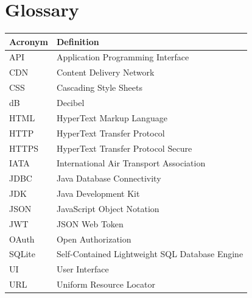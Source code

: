 \documentclass[12pt]{article}
\begin{document}
\newpage

\section{Glossary}

\begin{tabular}{|l|l|}
\hline
Acronym & Definition \\
\hline
API & Application Programming Interface \\
CDN & Content Delivery Network \\
CSS & Cascading Style Sheets \\
dB & Decibel \\
HTML & HyperText Markup Language \\
HTTP & HyperText Transfer Protocol \\
HTTPS & HyperText Transfer Protocol Secure \\
IATA & International Air Transport Association \\
JDBC & Java Database Connectivity \\
JDK & Java Development Kit \\
JSON & JavaScript Object Notation \\
JWT & JSON Web Token \\
OAuth & Open Authorization \\
SQLite & Self-Contained Lightweight SQL Database Engine \\
UI & User Interface \\
URL & Uniform Resource Locator \\
\hline
\end{tabular}
\end{document}
